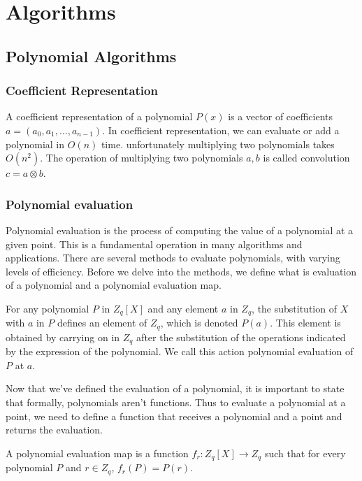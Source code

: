 \part{Algorithms}

\chapter{Polynomial Algorithms}\label{polynomials}


\section{Coefficient Representation}\label{polynomials:coeffcient-pres}
A coefficient representation of a polynomial $P(x)$ is a vector of coefficients 
$a=(a_0,a_1,\dots, a_{n-1})$.
In coefficient representation, we can evaluate or add a polynomial in $O(n)$ time. 
unfortunately multiplying two polynomials takes $O(n^2)$.
The operation of multiplying two polynomials $a,b$ is called convolution $c=a\otimes b$.

\section{Polynomial evaluation}
Polynomial evaluation is the process of computing the value of a polynomial at a given point.
This is a fundamental operation in many algorithms and applications. 
There are several methods to evaluate polynomials, with varying levels of efficiency.
Before we delve into the methods, we define what is evaluation of a polynomial and a polynomial evaluation map.

\begin{defn} \label{def:poly-eval}
  For any polynomial $P$ in $Z_q[X]$ and any element $a$ in $Z_q$,
  the substitution of $X$ with $a$ in $P$ defines an element of $Z_q$, which is denoted $P(a)$.
  This element is obtained by carrying on in $Z_q$ after the substitution of the operations indicated by 
  the expression of the polynomial.
  We call this action polynomial evaluation of $P$ at $a$.
\end{defn}

Now that we've defined the evaluation of a polynomial, it is important to state that formally, polynomials aren't functions. 
Thus to evaluate a polynomial at a point, we need to define a function that receives a polynomial and a point and returns the evaluation.
\begin{defn}
  A polynomial evaluation map is a function $f_r:Z_q[X]\to Z_q$ such that for every polynomial $P$ and $r\in Z_q$,
  $f_r(P)=P(r)$.
\end{defn}

